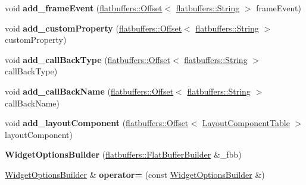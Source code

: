 \begin{DoxyCompactItemize}
void {\bfseries add\+\_\+frame\+Event} (\hyperlink{structflatbuffers_1_1Offset}{flatbuffers\+::\+Offset}$<$ \hyperlink{structflatbuffers_1_1String}{flatbuffers\+::\+String} $>$ frame\+Event)
\item 
\mbox{\label{structflatbuffers_1_1WidgetOptionsBuilder_a74ca046ab67b512f00f9e9a4156d7a51}} 
void {\bfseries add\+\_\+custom\+Property} (\hyperlink{structflatbuffers_1_1Offset}{flatbuffers\+::\+Offset}$<$ \hyperlink{structflatbuffers_1_1String}{flatbuffers\+::\+String} $>$ custom\+Property)
\item 
\mbox{\label{structflatbuffers_1_1WidgetOptionsBuilder_a44c4def4d6effc6d0ed2237789aac637}} 
void {\bfseries add\+\_\+call\+Back\+Type} (\hyperlink{structflatbuffers_1_1Offset}{flatbuffers\+::\+Offset}$<$ \hyperlink{structflatbuffers_1_1String}{flatbuffers\+::\+String} $>$ call\+Back\+Type)
\item 
\mbox{\label{structflatbuffers_1_1WidgetOptionsBuilder_ad4267727fe9bd71e95a98a27d0ae4d79}} 
void {\bfseries add\+\_\+call\+Back\+Name} (\hyperlink{structflatbuffers_1_1Offset}{flatbuffers\+::\+Offset}$<$ \hyperlink{structflatbuffers_1_1String}{flatbuffers\+::\+String} $>$ call\+Back\+Name)
\item 
\mbox{\label{structflatbuffers_1_1WidgetOptionsBuilder_a4ff452be8f7f3fe9df5d954a98b02231}} 
void {\bfseries add\+\_\+layout\+Component} (\hyperlink{structflatbuffers_1_1Offset}{flatbuffers\+::\+Offset}$<$ \hyperlink{structflatbuffers_1_1LayoutComponentTable}{Layout\+Component\+Table} $>$ layout\+Component)
\item 
\mbox{\label{structflatbuffers_1_1WidgetOptionsBuilder_a76069e10935edf0ef3cdec035a66b959}} 
{\bfseries Widget\+Options\+Builder} (\hyperlink{classflatbuffers_1_1FlatBufferBuilder}{flatbuffers\+::\+Flat\+Buffer\+Builder} \&\+\_\+fbb)
\item 
\mbox{\label{structflatbuffers_1_1WidgetOptionsBuilder_aab430614ffa5fcb90274421c5795c5a2}} 
\hyperlink{structflatbuffers_1_1WidgetOptionsBuilder}{Widget\+Options\+Builder} \& {\bfseries operator=} (const \hyperlink{structflatbuffers_1_1WidgetOptionsBuilder}{Widget\+Options\+Builder} \&)

\end{DoxyCompactItemize}
